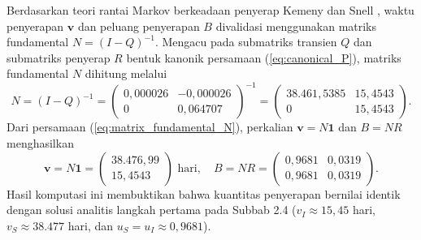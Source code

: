 \documentclass[12pt,a4paper]{article}
\numberwithin{equation}{section}
\begin{document}
Berdasarkan teori rantai Markov berkeadaan penyerap Kemeny dan Snell \cite{kemeny1976}, waktu penyerapan $\mathbf{v}$ dan peluang penyerapan $B$ divalidasi menggunakan matriks fundamental $N = (I - Q)^{-1}$. Mengacu pada submatriks transien $Q$ dan submatriks penyerap $R$ bentuk kanonik persamaan (\ref{eq:canonical_P}), matriks fundamental $N$ dihitung melalui
\begin{equation}
  N = (I - Q)^{-1} = 
  \begin{pmatrix}
    0{,}000026 & -0{,}000026 \\
    0          & 0{,}064707
  \end{pmatrix}^{-1}
  =
  \begin{pmatrix}
    38.461{,}5385 & 15{,}4543 \\
    0             & 15{,}4543
  \end{pmatrix}.
  \label{eq:matrix_fundamental_N}
\end{equation}
Dari persamaan (\ref{eq:matrix_fundamental_N}), perkalian $\mathbf{v} = N\mathbf{1}$ dan $B = NR$ menghasilkan
\[
  \mathbf{v} = N\mathbf{1} = 
  \begin{pmatrix}
    38.476{,}99 \\
    15{,}4543
  \end{pmatrix} \text{ hari},
  \quad
  B = NR = 
  \begin{pmatrix}
    0{,}9681 & 0{,}0319 \\
    0{,}9681 & 0{,}0319
  \end{pmatrix}.
\]
Hasil komputasi ini membuktikan bahwa kuantitas penyerapan bernilai identik dengan solusi analitis langkah pertama pada Subbab 2.4 ($v_I \approx 15{,}45$ hari, $v_S \approx 38.477$ hari, dan $u_S = u_I \approx 0{,}9681$).
\end{document}
